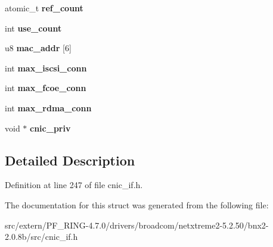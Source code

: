 \begin{DoxyCompactItemize}
\item 
\hypertarget{structcnic__dev_a49407f8389700153d28aca3ce04cfade}{
atomic\_\-t {\bfseries ref\_\-count}}
\label{structcnic__dev_a49407f8389700153d28aca3ce04cfade}

\item 
\hypertarget{structcnic__dev_a90faa88d014f87cfaf5edd74f9166268}{
int {\bfseries use\_\-count}}
\label{structcnic__dev_a90faa88d014f87cfaf5edd74f9166268}

\item 
\hypertarget{structcnic__dev_a9e165796ff8f154f49fc228b4b47acc7}{
u8 {\bfseries mac\_\-addr} \mbox{[}6\mbox{]}}
\label{structcnic__dev_a9e165796ff8f154f49fc228b4b47acc7}

\item 
\hypertarget{structcnic__dev_acf574a0ff288ac984c0593608c59c489}{
int {\bfseries max\_\-iscsi\_\-conn}}
\label{structcnic__dev_acf574a0ff288ac984c0593608c59c489}

\item 
\hypertarget{structcnic__dev_a0880030991b36d0716e842c1f0c86cea}{
int {\bfseries max\_\-fcoe\_\-conn}}
\label{structcnic__dev_a0880030991b36d0716e842c1f0c86cea}

\item 
\hypertarget{structcnic__dev_a1e5e15b25172f5e9d07e6018cca82c58}{
int {\bfseries max\_\-rdma\_\-conn}}
\label{structcnic__dev_a1e5e15b25172f5e9d07e6018cca82c58}

\item 
\hypertarget{structcnic__dev_a3d6354b6447dec19ef860db30fa8d547}{
void $\ast$ {\bfseries cnic\_\-priv}}
\label{structcnic__dev_a3d6354b6447dec19ef860db30fa8d547}

\end{DoxyCompactItemize}


\subsection{Detailed Description}


Definition at line 247 of file cnic\_\-if.h.



The documentation for this struct was generated from the following file:\begin{DoxyCompactItemize}
\item 
src/extern/PF\_\-RING-\/4.7.0/drivers/broadcom/netxtreme2-\/5.2.50/bnx2-\/2.0.8b/src/cnic\_\-if.h\end{DoxyCompactItemize}
